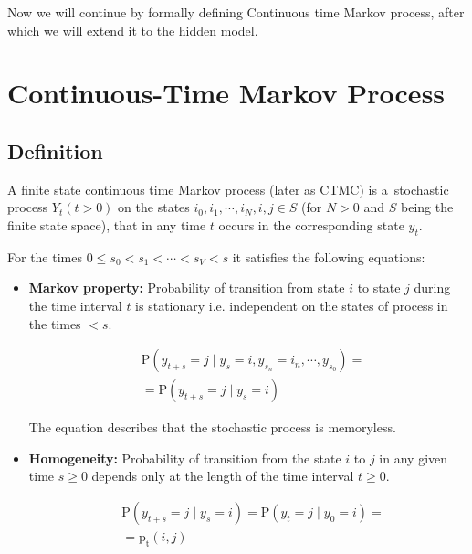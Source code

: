 \documentclass[thesis=M,english]{FITthesis}[2012/10/20]
\begin{document}
Now we will continue by formally defining Continuous time Markov process, after which we will extend it to the hidden model.

\section{Continuous-Time Markov Process} 

\subsection{Definition}
A finite state continuous time Markov process (later as CTMC) is a~stochastic process $Y_t (t > 0)$ on the states $i_0, i_1, \cdots, i_N, i, j \in S$ (for $N>0$ and $S$ being the finite state space), that in any time $t$  occurs in the corresponding state $y_t$. 

For the times $0 \leq s_0 < s_1 < \cdots < s_V < s$ it satisfies the following equations: 
\begin{itemize}
\item \textbf{Markov property:} Probability of transition from state $i$ to state $j$ during the time interval $t$ is stationary i.e. independent on the states of process in the times $< s$.  
    
\begin{equation}
\begin{aligned}
& \mathrm{P}( y_{t+s} = j \mid y_s = i, y_{s_n} = i_n, \cdots , y_{s_0} ) = \\ 
& = \mathrm{P}( y_{t+s} = j \mid y_s = i )
\end{aligned}
\end{equation}

The equation describes that the stochastic process is memoryless.

\item \textbf{Homogeneity:} Probability of transition from the state $i$ to $j$ in any given time $s \geq 0$ depends only at the length of the time interval $t \geq 0$. 

\begin{equation}
\begin{aligned}
& \mathrm{P}( y_{t+s} = j \mid y_s = i ) = \mathrm{P}( y_t = j \mid y_0 = i ) = \\
& = \mathrm{p_t}(i,j)
\end{aligned}
\end{equation}

\end{itemize}
\end{document}
